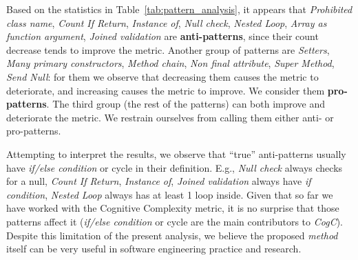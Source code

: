 \begin{table}[ht]
\end{table}

Based on the statistics in Table~\ref{tab:pattern_analysis}, it appears that \emph{Prohibited class name}, \emph{Count If Return}, \emph{Instance of}, \emph{Null check}, \emph{Nested Loop},
\emph{Array as function argument}, \emph{Joined validation} are \textbf{anti-patterns}, since their count decrease tends to improve the metric. Another group of patterns are \emph{Setters}, \emph{Many primary constructors}, \emph{Method chain}, \emph{Non final attribute}, \emph{Super Method}, \emph{Send Null}: for them we observe that decreasing them causes the metric to deteriorate, and increasing causes the metric to improve. We consider them \textbf{pro-patterns}. The third group (the rest of the patterns) can both improve and deteriorate the metric. We restrain ourselves from calling them either anti- or pro-patterns.

Attempting to interpret the results, we observe that ``true'' anti-patterns usually have \emph{if/else condition} or cycle in their definition.
E.g., \emph{Null check} always checks for a null, \emph{Count If Return}, \emph{Instance of},
\emph{Joined validation} always have \emph{if condition}, \emph{Nested Loop} always has at least 1 loop inside. Given that so far we have worked with the Cognitive Complexity metric, it is no surprise that those patterns affect it (\emph{if/else condition} or cycle are the main contributors to \emph{CogC}). Despite this limitation of the present analysis, we believe the proposed \textit{method} itself can be very useful in software engineering practice and research.





